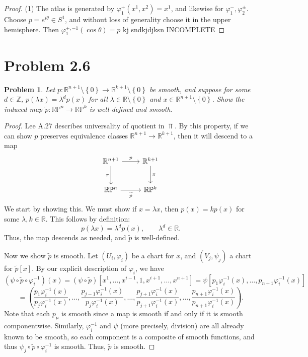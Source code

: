 \documentclass[11pt, letterpaper]{article}
\theoremstyle{theorem}
\newtheorem{problem}{Problem}
\begin{document}
\begin{proof}
	(1) The atlas is generated by $\varphi ^+_1(x^1,x^2)=x^1$, and likewise for $\varphi _1^-,\varphi _2^{\pm} $. Choose $p=e^{i\theta } \in S^1$, and without loss of generality choose it in the upper hemisphere. Then $\varphi _1^{+,-1} (\cos \theta )=p$ kj sndkjdjksn INCOMPLETE
\end{proof}


\section{Problem 2.6}

\begin{problem}\label{6}
	Let $p : \mathbb{R} ^{n+1} \setminus \left\{ 0 \right\}  \to \mathbb{R} ^{k+1} \setminus \left\{ 0 \right\} $ be smooth, and suppose for some $d\in\mathbb{Z} $, $p(\lambda x)=\lambda ^dp(x)$ for all $\lambda \in\mathbb{R} \setminus \left\{ 0 \right\} $ and $x\in\mathbb{R} ^{n+1} \setminus \left\{ 0 \right\} $. Show the induced map $\widetilde{p} : \mathbb{R} \mathbb{P} ^n \to \mathbb{R} \mathbb{P} ^k$ is well-defined and smooth.
\end{problem}
\begin{proof}
	Lee A.27 describes universality of quotient in $\Top $. By this property, if we can show $p$ preserves equivalence classes $\mathbb{R} ^{n+1} \to \mathbb{R} ^{k+1} $, then it will descend to a map
	\[\begin{tikzcd}[row sep = 2.5em, column sep = 2.5em]
	\mathbb{R} ^{n+1} \ar[" p ", r] \ar[" \pi "', d]  & \mathbb{R} ^{k+1} \ar[" \pi  ", d]  \\
	\mathbb{R} \mathbb{P}^{n} \ar[" \widetilde{p}  "', r]  & \mathbb{R} \mathbb{P}^{k} 
	\end{tikzcd}\]
	We start by showing this. We must show if $x=\lambda x$, then $p(x)=k p(x)$ for some $\lambda ,k\in\mathbb{R} $. This follows by definition:
	\[
		p(\lambda x)=\lambda ^dp(x),\qquad \lambda ^d\in\mathbb{R} 
	.\]
	Thus, the map descends as needed, and $\widetilde{p} $ is well-defined.

	Now we show $\widetilde{p} $ is smooth. Let $(U_i,\varphi _i)$ be a chart for $x$, and $(V_j,\psi _j)$ a chart for $\widetilde{p} [x]$. By our explicit description of $\varphi _i$, we have
	\[
		(\psi \circ \widetilde{p} \circ \varphi _i ^{-1} )(x) = (\psi \circ \widetilde{p} )[x^1, \ldots ,x^{i-1} ,1,x^{i+1} , \ldots ,x^{n+1} ]=\psi \left[ p_1\varphi _i^{-1} (x), \ldots , p_{n+1} \varphi _i^{-1} (x) \right] 
	\]
	\[
	=\left( \frac{p_1 \varphi_i ^{-1} (x)}{p_j\varphi _i^{-1} (x)} , \ldots , \frac{p_{j-1} \varphi ^{-1} _i(x)}{ p_j\varphi _i^{-1} (x)}, \ldots , \frac{p_{j+1} \varphi ^{-1} _i(x)}{ p_{j+1}\varphi _i^{-1} (x)}, \ldots ,\frac{p_{n+1} \varphi ^{-1} _i(x)}{ p_{n+1}\varphi _i^{-1} (x)}\right) 
	.\]
	Note that each $p_\mu $ is smooth since a map is smooth if and only if it is smooth componentwise. Similarly, $\varphi _i^{-1} $ and $\psi $ (more precisely, division) are all already known to be smooth, so each component is a composite of smooth functions, and thus $\psi_j \circ \widetilde{p} \circ \varphi _i ^{-1} $ is smooth. Thus, $\widetilde{p} $ is smooth.
\end{proof}
\end{document}
